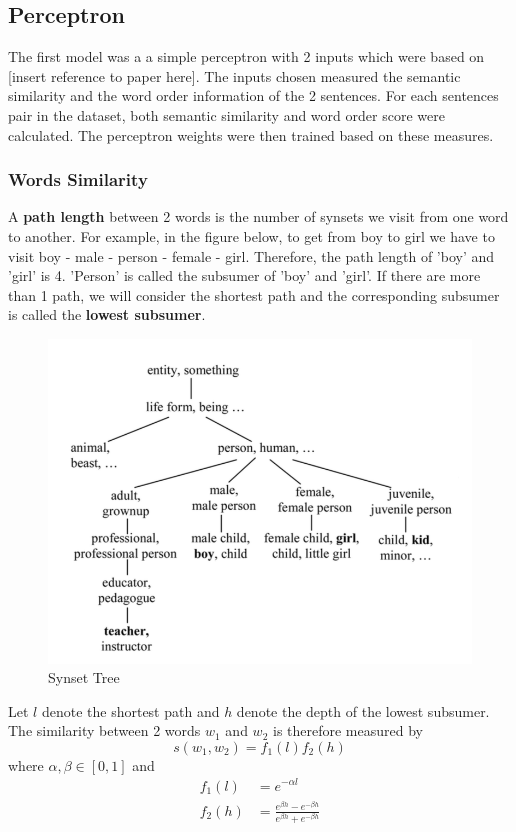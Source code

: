 \subsection{Perceptron}

The first model was a a simple perceptron with 2 inputs which were based on [insert reference to paper here]. The inputs chosen measured the semantic similarity and the word order information of the 2 sentences. For each sentences pair in the dataset, both semantic similarity and word order score were calculated. The perceptron weights were then trained based on these measures.

\subsubsection{Words Similarity}
A \textbf{path length} between 2 words is the number of synsets we visit from one word to another. For example, in the figure below, to get from boy to girl we have to visit boy - male - person - female - girl. Therefore, the path length of 'boy' and 'girl' is 4. 'Person' is called the subsumer of 'boy' and 'girl'. If there are more than 1 path, we will consider the shortest path and the corresponding subsumer is called the \textbf{lowest subsumer}.


 \begin{figure}
\centering
\includegraphics[scale=0.7]{Synset_tree}
\caption{Synset Tree}
 \end{figure}

Let $l$ denote the shortest path and $h$ denote the depth of the lowest subsumer. The similarity between 2 words $w_1$ and $w_2$ is therefore measured by 
\begin{equation*}
s(w_1, w_2) = f_1(l) f_2(h)
\end{equation*}
where $\alpha, \beta \in [0,1]$ and 
\begin{align*}
	f_1(l)		&= e^{-\alpha l} \\
	f_2(h)	&= \frac{e^{\beta h} - e^{-\beta h}}{e^{\beta h} + e^{-\beta h}} \\
\end{align*}

